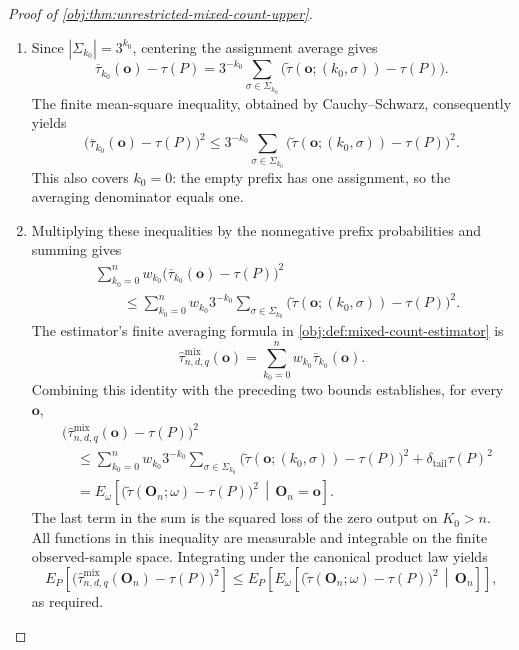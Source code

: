 \begin{proof}[Proof of \cref{obj:thm:unrestricted-mixed-count-upper}]
\begin{enumerate}
\item Since \(|\Sigma_{k_0}|=3^{k_0}\), centering the assignment average gives
\[
\overline\tau_{k_0}(\mathbf o)-\tau(P)
=
3^{-k_0}\sum_{\sigma\in\Sigma_{k_0}}
 \bigl(\widetilde\tau(\mathbf o;(k_0,\sigma))-\tau(P)\bigr).
\]
The finite mean-square inequality, obtained by Cauchy--Schwarz, consequently yields
\[
\bigl(\overline\tau_{k_0}(\mathbf o)-\tau(P)\bigr)^2
\le
3^{-k_0}\sum_{\sigma\in\Sigma_{k_0}}
 \bigl(\widetilde\tau(\mathbf o;(k_0,\sigma))-\tau(P)\bigr)^2.
\]
This also covers \(k_0=0\): the empty prefix has one assignment, so the averaging denominator equals one.

\item Multiplying these inequalities by the nonnegative prefix probabilities and summing gives
\[
\begin{aligned}
&\sum_{k_0=0}^{n}w_{k_0}
 \bigl(\overline\tau_{k_0}(\mathbf o)-\tau(P)\bigr)^2\\
&\qquad\le
\sum_{k_0=0}^{n}w_{k_0}3^{-k_0}
 \sum_{\sigma\in\Sigma_{k_0}}
 \bigl(\widetilde\tau(\mathbf o;(k_0,\sigma))-\tau(P)\bigr)^2.
\end{aligned}
\]
The estimator's finite averaging formula in
\cref{obj:def:mixed-count-estimator} is
\[
\widehat\tau^{\mathrm{mix}}_{n,d,q}(\mathbf o)
=
\sum_{k_0=0}^{n}w_{k_0}\overline\tau_{k_0}(\mathbf o).
\]
Combining this identity with the preceding two bounds establishes, for every \(\mathbf o\),
\[
\begin{aligned}
&\bigl(\widehat\tau^{\mathrm{mix}}_{n,d,q}(\mathbf o)-\tau(P)\bigr)^2\\
&\quad\le
\sum_{k_0=0}^{n}w_{k_0}3^{-k_0}
 \sum_{\sigma\in\Sigma_{k_0}}
 \bigl(\widetilde\tau(\mathbf o;(k_0,\sigma))-\tau(P)\bigr)^2
+\delta_{\mathrm{tail}}\tau(P)^2\\
&\quad=
E_\omega\!\left[
 \bigl(\widetilde\tau(\mathbf O_n;\omega)-\tau(P)\bigr)^2
 \,\middle|\,\mathbf O_n=\mathbf o
\right].
\end{aligned}
\]
The last term in the sum is the squared loss of the zero output on \(K_0>n\). All functions in this inequality are measurable and integrable on the finite observed-sample space. Integrating under the canonical product law yields
\[
E_P\!\left[
 \bigl(\widehat\tau^{\mathrm{mix}}_{n,d,q}(\mathbf O_n)-\tau(P)\bigr)^2
\right]
\le
E_P\!\left[
 E_\omega\!\left[
  \bigl(\widetilde\tau(\mathbf O_n;\omega)-\tau(P)\bigr)^2
  \,\middle|\,\mathbf O_n
 \right]
\right],
\]
as required.
\end{enumerate}
\end{proof}

